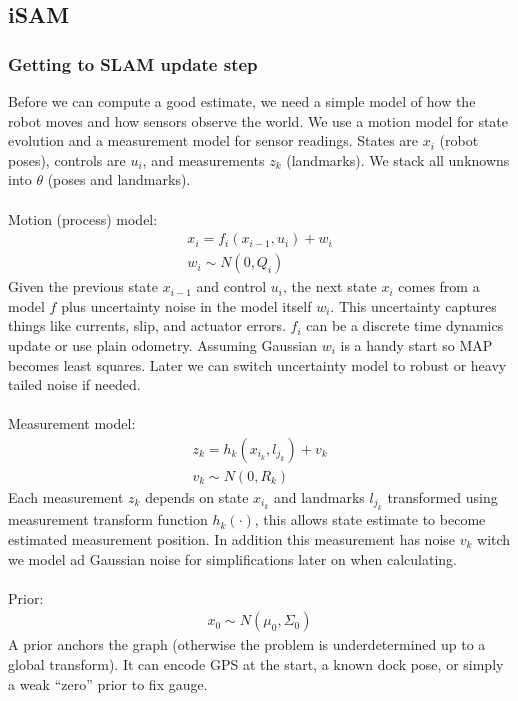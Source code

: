 \subsection{iSAM}
\subsubsection{Getting to SLAM update step}
Before we can compute a good estimate, we need a simple model of how the robot moves and how sensors observe the world. We use a motion model for state evolution and a measurement model for sensor readings. States are $x_i$ (robot poses), controls are $u_i$, and measurements $z_k$ (landmarks). We stack all unknowns into $\theta$ (poses and landmarks).
\\ \\
Motion (process) model:
$$
    \begin{aligned}
        x_i = f_{i}(x_{i-1}, u_i) + w_i \\ 
        w_i \sim N(0, Q_i) \qquad
    \end{aligned}
$$
Given the previous state $x_{i-1}$ and control $u_i$, the next state $x_i$ comes from a model $f$ plus uncertainty noise in the model itself $w_i$. This uncertainty captures things like currents, slip, and actuator errors. $f_i$ can be a discrete time dynamics update or use plain odometry. Assuming Gaussian $w_i$ is a handy start so MAP becomes least squares. Later we can switch uncertainty model to robust or heavy tailed noise if needed.
\\ \\
Measurement model:
$$
    \begin{aligned}
        z_k = h_{k}(x_{i_k}, l_{j_k}) + v_k \\ 
        v_k \sim N(0, R_k) \qquad
    \end{aligned}
$$
Each measurement $z_k$ depends on state $x_{i_k}$ and landmarks $l_{j_k}$ transformed using measurement transform function $h_{k}(\cdot)$, this allows state estimate to become estimated measurement position. In addition this measurement has noise $v_k$ witch we model ad Gaussian noise for simplifications later on when calculating.
\\ \\
Prior:
$$
    \begin{aligned}
        x_0 \sim N(\mu_{0}, \Sigma_{0})
    \end{aligned}
$$
A prior anchors the graph (otherwise the problem is underdetermined up to a global transform). It can encode GPS at the start, a known dock pose, or simply a weak ``zero'' prior to fix gauge.
